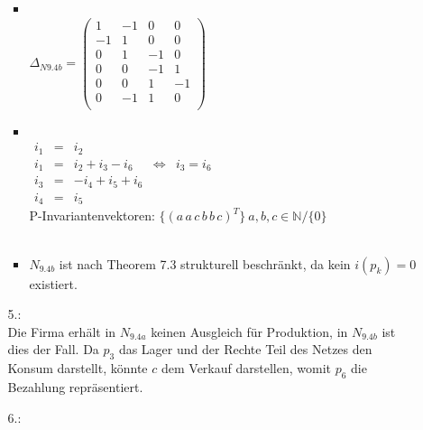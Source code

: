 \documentclass[a4paper,11pt,fleqn]{scrartcl}
\begin{document}
\begin{enumerate}
\begin{enumerate}
\begin{itemize}
				\item \quad \\
				\( \Delta_{N9.4b} =
			\begin{pmatrix}
				1 & -1 & 0 & 0 \\
				-1 & 1 & 0 & 0 \\
				0 & 1 & -1 & 0 \\
				0 & 0 & -1 & 1 \\
				0 & 0 & 1 & -1 \\
				0 & -1 & 1 & 0 \\
			\end{pmatrix}
			\) \\
			\item \quad \\
			\(\begin{array}{rclcl}
				i_1 &=& i_2 \\
				i_1 &=& i_2 + i_3 - i_6 &\Leftrightarrow & i_3 = i_6 \\
				i_3 &=& -i_4 + i_5 + i_6 \\
				i_4 &=& i_5
			\end{array}
			\) \\
			P-Invariantenvektoren: \(\Big\{(a\,a\,c\,b\,b\,c)^T\Big\}\ a,b,c\in\mathbb{N}/\{0\}\) \\ \\
			\item \(N_{9.4b}\) ist nach Theorem 7.3 strukturell beschränkt, da kein \(i(p_k) = 0\) existiert. \\
			
			\end{itemize}
			\item[5.:]\quad \\
			Die Firma erhält in \(N_{9.4a}\) keinen Ausgleich für Produktion, in \(N_{9.4b}\) ist dies der Fall.
			Da \(p_3\) das Lager und der Rechte Teil des Netzes den Konsum darstellt, könnte \(c\) dem Verkauf 
			darstellen, womit \(p_6\) die Bezahlung repräsentiert.
			\item[6.:]\quad \\
			\todo
		\end{enumerate}
	\end{enumerate}
\end{document}
